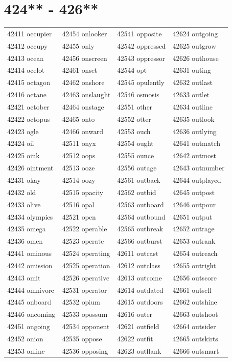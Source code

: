 \documentclass[10pt, oneside]{book}
\begin{document}
\begin{table}
	\centering
	\section*{424** - 426**}
	\begin{tabular}{l l l l}
42411 occupier &42454 onlooker &42541 opposite &42624 outgoing\\
42412 occupy &42455 only &42542 oppressed &42625 outgrow\\
42413 ocean &42456 onscreen &42543 oppressor &42626 outhouse\\
42414 ocelot &42461 onset &42544 opt &42631 outing\\
42415 octagon &42462 onshore &42545 opulently &42632 outlast\\
42416 octane &42463 onslaught &42546 osmosis &42633 outlet\\
42421 october &42464 onstage &42551 other &42634 outline\\
42422 octopus &42465 onto &42552 otter &42635 outlook\\
42423 ogle &42466 onward &42553 ouch &42636 outlying\\
42424 oil &42511 onyx &42554 ought &42641 outmatch\\
42425 oink &42512 oops &42555 ounce &42642 outmost\\
42426 ointment &42513 ooze &42556 outage &42643 outnumber\\
42431 okay &42514 oozy &42561 outback &42644 outplayed\\
42432 old &42515 opacity &42562 outbid &42645 outpost\\
42433 olive &42516 opal &42563 outboard &42646 outpour\\
42434 olympics &42521 open &42564 outbound &42651 output\\
42435 omega &42522 operable &42565 outbreak &42652 outrage\\
42436 omen &42523 operate &42566 outburst &42653 outrank\\
42441 ominous &42524 operating &42611 outcast &42654 outreach\\
42442 omission &42525 operation &42612 outclass &42655 outright\\
42443 omit &42526 operative &42613 outcome &42656 outscore\\
42444 omnivore &42531 operator &42614 outdated &42661 outsell\\
42445 onboard &42532 opium &42615 outdoors &42662 outshine\\
42446 oncoming &42533 opossum &42616 outer &42663 outshoot\\
42451 ongoing &42534 opponent &42621 outfield &42664 outsider\\
42452 onion &42535 oppose &42622 outfit &42665 outskirts\\
42453 online &42536 opposing &42623 outflank &42666 outsmart\\
	\end{tabular}
 \end{table}
\clearpage
\end{document}
